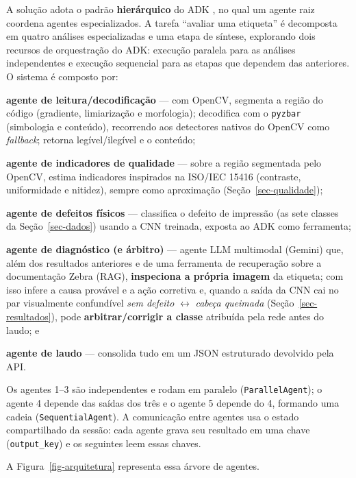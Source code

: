 \documentclass[
	article,			%
	11pt,				%
	oneside,			%
	a4paper,			%
	english,			%
	brazilian,			%
	sumario=tradicional
	]{abntex2}
\begin{document}
A solução adota o padrão \textbf{hierárquico} do ADK \cite{adk_docs}, no qual um
agente raiz coordena agentes especializados. A tarefa ``avaliar uma etiqueta'' é
decomposta em quatro análises especializadas e uma etapa de síntese, explorando
dois recursos de orquestração do ADK: execução paralela para as análises
independentes e execução sequencial para as etapas que dependem das anteriores. O
sistema é composto por:
\begin{alineas}
	\item \textbf{agente de leitura/decodificação} --- com OpenCV, segmenta a região
	do código (gradiente, limiarização e morfologia); decodifica com o \texttt{pyzbar}
	(simbologia e conteúdo), recorrendo aos detectores nativos do OpenCV como
	\textit{fallback}; retorna legível/ilegível e o conteúdo;
	\item \textbf{agente de indicadores de qualidade} --- sobre a região segmentada
	pelo OpenCV, estima indicadores inspirados na ISO/IEC 15416 (contraste,
	uniformidade e nitidez), sempre como aproximação (Seção~\ref{sec-qualidade});
	\item \textbf{agente de defeitos físicos} --- classifica o defeito de impressão
	(as sete classes da Seção~\ref{sec-dados}) usando a CNN treinada, exposta ao
	ADK como ferramenta;
	\item \textbf{agente de diagnóstico (e árbitro)} --- agente LLM multimodal
	(Gemini) que, além dos resultados anteriores e de uma ferramenta de recuperação
	sobre a documentação Zebra (RAG), \textbf{inspeciona a própria imagem} da
	etiqueta; com isso infere a causa provável e a ação corretiva e, quando a saída
	da CNN cai no par visualmente confundível \emph{sem defeito}
	$\leftrightarrow$ \emph{cabeça queimada} (Seção~\ref{sec-resultados}), pode
	\textbf{arbitrar/corrigir a classe} atribuída pela rede antes do laudo; e
	\item \textbf{agente de laudo} --- consolida tudo em um JSON estruturado
	devolvido pela API.
\end{alineas}

Os agentes 1--3 são independentes e rodam em paralelo (\texttt{ParallelAgent}); o
agente 4 depende das saídas dos três e o agente 5 depende do 4, formando uma
cadeia (\texttt{SequentialAgent}). A comunicação entre agentes usa o estado
compartilhado da sessão: cada agente grava seu resultado em uma chave
(\texttt{output\_key}) e os seguintes leem essas chaves.

A Figura~\ref{fig-arquitetura} representa essa árvore de agentes.
\end{document}
